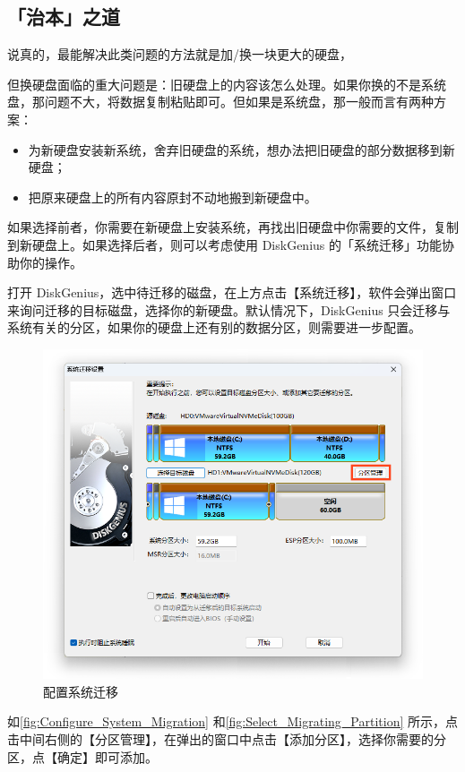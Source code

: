 {{{\subsection{「治本」之道}

说真的，最能解决此类问题的方法就是加/换一块更大的硬盘，

但换硬盘面临的重大问题是：旧硬盘上的内容该怎么处理。如果你换的不是系统盘，那问题不大，将数据复制粘贴即可。但如果是系统盘，那一般而言有两种方案：

\begin{itemize}
  \item 为新硬盘安装新系统，舍弃旧硬盘的系统，想办法把旧硬盘的部分数据移到新硬盘；
  \item 把原来硬盘上的所有内容原封不动地搬到新硬盘中。
\end{itemize}

如果选择前者，你需要在新硬盘上安装系统，再找出旧硬盘中你需要的文件，复制到新硬盘上。如果选择后者，则可以考虑使用 DiskGenius 的「系统迁移」功能协助你的操作。

打开 DiskGenius，选中待迁移的磁盘，在上方点击【系统迁移】，软件会弹出窗口来询问迁移的目标磁盘，选择你的新硬盘。默认情况下，DiskGenius 只会迁移与系统有关的分区，如果你的硬盘上还有别的数据分区，则需要进一步配置。

\begin{figure}[htb!]
  \centering
  \includegraphics[width=.6\textwidth]{assets/advanced/Configure_System_Migration.png}
  \caption{配置系统迁移}
  \label{fig:Configure_System_Migration}
\end{figure}

如\autoref{fig:Configure_System_Migration} 和\autoref{fig:Select_Migrating_Partition} 所示，点击中间右侧的【分区管理】，在弹出的窗口中点击【添加分区】，选择你需要的分区，点【确定】即可添加。

}}}
